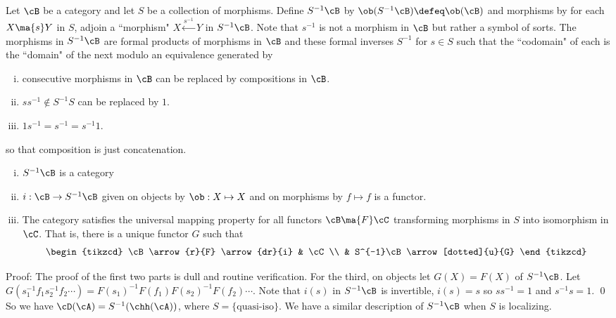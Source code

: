 Let $\cB$ be a category and let $S$ be a collection of morphisms. Define $S^{-1}\cB$ by $\ob(S^{-1}\cB)\defeq \ob(\cB)$ and morphisms by for each $X \ma{s} Y$ in $S$, adjoin a ``morphism" $X \xleftarrow{s^{-1}} Y$ in $S^{-1}\cB$. Note that $s^{-1}$ is not a morphism in $\cB$ but rather a symbol of sorts. The morphisms in $S^{-1}\cB$ are formal products of morphisms in $\cB$ and these formal inverses $S^{-1}$ for $s \in S$ such that the ``codomain" of each is the ``domain" of the next modulo an equivalence generated by 
\begin{enumerate}[(i)]
\item consecutive morphisms in $\cB$ can be replaced by compositions in $\cB$. 
\item $ss^{-1} \notin S^{-1}S$ can be replaced by $1$.
\item $1s^{-1}=s^{-1}=s^{-1}1$.
\end{enumerate}

so that composition is just concatenation. 

\begin{prop}
\begin{enumerate}[(i)]
\item $S^{-1}\cB$ is a category
\item $i: \cB \to S^{-1}\cB$ given on objects by $\ob: X \mapsto X$ and on morphisms by $f \mapsto f$ is a functor.
\item The category satisfies the universal mapping property for all functors $\cB \ma{F} \cC$ transforming morphisms in $S$ into isomorphism in $\cC$. That is, there is a unique functor $G$ such that 
\[
\begin{tikzcd}
\cB \arrow{r}{F} \arrow{dr}{i} & \cC \\
&  S^{-1}\cB \arrow[dotted]{u}{G}
\end{tikzcd}
\]
\end{enumerate}
\end{prop}

\noindent Proof: The proof of the first two parts is dull and routine verification. For the third, on objects let $G(X)=F(X)$ of $S^{-1}\cB$. Let $G(s_1^{-1}f_1s_2^{-1}f_2 \cdots)=F(s_1)^{-1}F(f_1)F(s_2)^{-1}F(f_2) \cdots$. Note that $i(s)$ in $S^{-1}\cB$ is invertible, $i(s)=s$ so $ss^{-1}=1$ and $s^{-1}s=1$. \qed \\

So we have $\cD(\cA)=S^{-1}(\chh(\cA))$, where $S=\{\text{quasi-iso}\}$. We have a similar description of $S^{-1}\cB$ when $S$ is localizing. 

